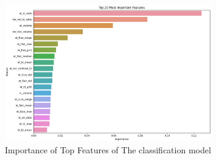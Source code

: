 \begin{figure}[H]
  \centering
  \includegraphics[width=0.8\textwidth]{Images/Chapter3/features.png}
  \caption{Importance of Top Features of The classification model}
  \label{fig:features}
\end{figure}


